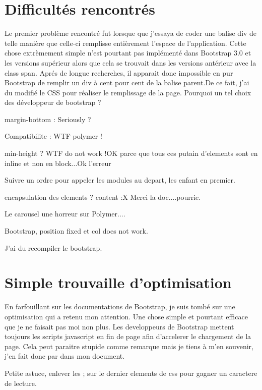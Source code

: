 \documentclass{article}
\begin{document}
\section{Difficult\'es rencontr\'es}
\hspace*{0.6cm}Le premier probl\`eme rencontr\'e fut lorsque que j'essaya de coder une balise div de telle mani\`ere que celle-ci remplisse enti\`erement l'espace de l'application. Cette chose extr\`emement simple n'est pourtant pas impl\'ement\'e dans Bootstrap 3.0 et les versions sup\'erieur alors que cela se trouvait dans les versions ant\'erieur avec la class span. Apr\'es de longue recherches, il apparait donc impossible en pur Bootstrap de remplir un div \`a cent pour cent de la balise parent.De ce fait, j'ai du modifi\'e le CSS pour r\'ealiser le remplissage de la page. Pourquoi un tel choix des d\'eveloppeur de bootstrap ?

margin-bottom : Seriously ?

Compatibilite : WTF polymer !

min-height ? WTF do not work !OK parce que tous ces putain d'elements sont en inline et non en block...Ok l'erreur

Suivre un ordre pour appeler les modules au depart, les enfant en premier.

encapsulation des elements ? content :X Merci la doc....pourrie.

Le carousel une horreur sur Polymer....

Bootstrap, position fixed et col does not work.

J'ai du recompiler le bootstrap.

\section{Simple trouvaille d'optimisation}
En farfouillant sur les documentations de Bootstrap, je suis tomb\'e sur une optimisation qui a retenu mon attention. Une chose simple et pourtant efficace que je ne faisait pas moi non plus. Les developpeurs de Bootstrap mettent toujours les scripts javascript en fin de page afin d'accelerer le chargement de la page. Cela peut paraitre stupide comme remarque mais je tiens \`a m'en souvenir, j'en fait donc par dans mon document.

Petite astuce, enlever les ; sur le dernier elements de css pour gagner un caractere de lecture.
\end{document}
